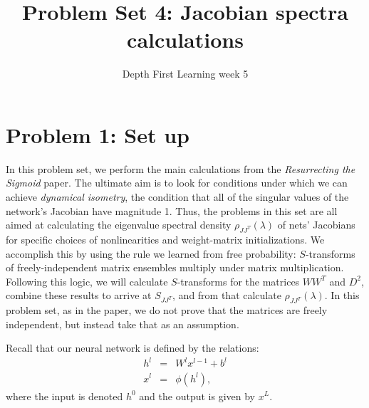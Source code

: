 \documentclass[a4paper]{article}
\title{Problem Set 4: Jacobian spectra calculations }
\date{Depth First Learning week 5}
\begin{document}
\maketitle


\section*{Problem 1: Set up}
In this problem set, we perform the main calculations from the  \emph{Resurrecting the Sigmoid} paper.  The ultimate aim is to look for conditions under which we can achieve \emph{dynamical isometry}, the condition that all of the singular values of the network's Jacobian have magnitude 1.  Thus, the problems in this set are all aimed at calculating the eigenvalue spectral density $\rho_{JJ^T}(\lambda)$  of nets' Jacobians for specific choices of nonlinearities and weight-matrix initializations. We accomplish this by using the rule we learned from free probability:  $S$-transforms of freely-independent matrix ensembles multiply under matrix multiplication.  Following this logic, we will calculate $S$-transforms for the matrices $WW^T$ and $D^2$, combine these results to arrive at $S_{JJ^T}$, and from that calculate $\rho_{JJ^T}(\lambda)$.  In this problem set, as in the paper, we do not prove that the matrices are freely independent, but instead take that as an assumption.

Recall that our neural network is defined by the relations:
\begin{eqnarray}
h^l &=& W^l x^{l-1} + b^l \\
x^l &=& \phi(h^l),
\end{eqnarray}
where the input is denoted $h^0$ and the output is given by $x^L$.  
\end{document}
